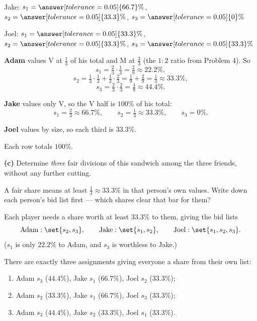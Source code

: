 \documentclass[12pt]{ximera}
\begin{document}
\begin{problem}
\begin{prompt}
\smallskip
Jake: $s_1 = \answer[tolerance=0.05]{66.7}\%$, \quad
$s_2 = \answer[tolerance=0.05]{33.3}\%$, \quad
$s_3 = \answer[tolerance=0.05]{0}\%$

\smallskip
Joel: $s_1 = \answer[tolerance=0.05]{33.3}\%$, \quad
$s_2 = \answer[tolerance=0.05]{33.3}\%$, \quad
$s_3 = \answer[tolerance=0.05]{33.3}\%$

\begin{feedback}
\textbf{Adam} values V at $\frac13$ of his total and M at $\frac23$ (the $1:2$ ratio
from Problem 4). So
\[
s_1 = \tfrac23\cdot\tfrac13 = \tfrac29 \approx 22.2\%,
\]
\[
s_2 = \tfrac13\cdot\tfrac13 + \tfrac13\cdot\tfrac23 = \tfrac19+\tfrac29 = \tfrac13 \approx 33.3\%,
\]
\[
s_3 = \tfrac23\cdot\tfrac23 = \tfrac49 \approx 44.4\%.
\]

\textbf{Jake} values only V, so the V half is $100\%$ of his total:
\[ s_1 = \tfrac23 \approx 66.7\%, \qquad s_2 = \tfrac13 \approx 33.3\%, \qquad s_3 = 0\%. \]

\textbf{Joel} values by size, so each third is $33.3\%$.

Each row totals $100\%$. \checkmark
\end{feedback}
\end{prompt}

\begin{prompt}
\textbf{(c)} Determine \emph{three} fair divisions of this sandwich among the three
friends, without any further cutting.

\begin{freeResponse}
\end{freeResponse}

\begin{hint}
A fair share means at least $\frac13 \approx 33.3\%$ in that person's own values.
Write down each person's bid list first --- which shares clear that bar for them?
\end{hint}

\begin{feedback}
Each player needs a share worth at least $33.3\%$ to them, giving the bid lists
\[
\text{Adam}: \set{s_2, s_3}, \qquad \text{Jake}: \set{s_1, s_2}, \qquad
\text{Joel}: \set{s_1, s_2, s_3}.
\]
($s_1$ is only $22.2\%$ to Adam, and $s_3$ is worthless to Jake.)

There are exactly three assignments giving everyone a share from their own list:
\begin{enumerate}
\item Adam $s_3$ ($44.4\%$), Jake $s_1$ ($66.7\%$), Joel $s_2$ ($33.3\%$);
\item Adam $s_2$ ($33.3\%$), Jake $s_1$ ($66.7\%$), Joel $s_3$ ($33.3\%$);
\item Adam $s_3$ ($44.4\%$), Jake $s_2$ ($33.3\%$), Joel $s_1$ ($33.3\%$).
\end{enumerate}


\end{feedback}
\end{prompt}
\end{problem}
\end{document}

